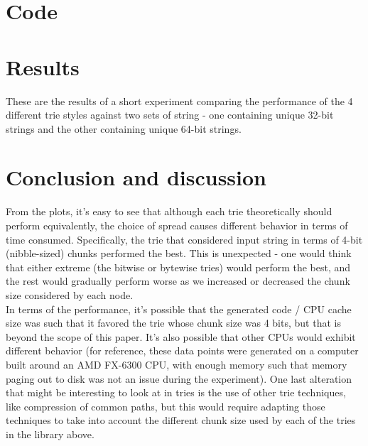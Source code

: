 \documentclass{llncs}
\begin{document}
\newpage
\section{Code}

\newpage


\newpage
\section{Results}
These are the results of a short experiment comparing the performance of the 4 different trie styles against two sets of string - one containing unique 32-bit strings and the other containing unique 64-bit strings.

\newpage
\section{Conclusion and discussion}
From the plots, it's easy to see that although each trie theoretically should perform equivalently, the choice of spread causes different behavior in terms of time consumed. Specifically, the trie that considered input string in terms of 4-bit (nibble-sized) chunks performed the best. This is unexpected - one would think that either extreme (the bitwise or bytewise tries) would perform the best, and the rest would gradually perform worse as we increased or decreased the chunk size considered by each node.\\
In terms of the performance, it's possible that the generated code / CPU cache size was such that it favored the trie whose chunk size was 4 bits, but that is beyond the scope of this paper. It's also possible that other CPUs would exhibit different behavior (for reference, these data points were generated on a computer built around an AMD FX-6300 CPU, with enough memory such that memory paging out to disk was not an issue during the experiment).
One last alteration that might be interesting to look at in tries is the use of other trie techniques, like compression of common paths, but this would require adapting those techniques to take into account the different chunk size used by each of the tries in the library above.
\end{document}

